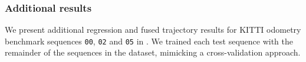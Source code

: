 \subsubsection{Additional results}
We present  additional regression and fused trajectory results for KITTI odometry benchmark sequences \texttt{00}, \texttt{02} and \texttt{05} in . We trained each test sequence with the remainder of the sequences in the dataset, mimicking a cross-validation approach.
